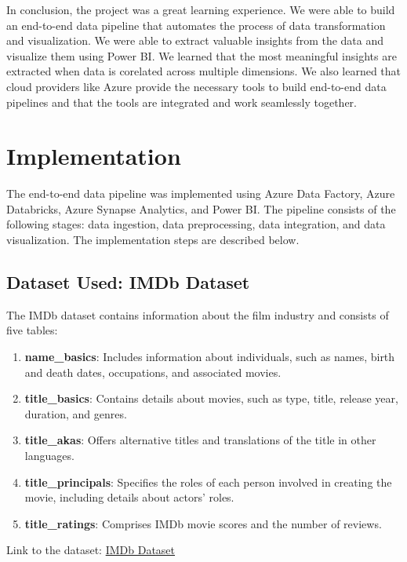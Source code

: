 \documentclass[a4paper,12pt]{article}
\begin{document}
In conclusion, the project was a great learning experience. We were able to build an end-to-end data pipeline that automates the process of data
transformation and visualization. We were able to extract valuable insights from the data and visualize them using Power BI. We learned that
the most meaningful insights are extracted when data is corelated across multiple dimensions. We also learned that cloud providers like Azure
provide the necessary tools to build end-to-end data pipelines and that the tools are integrated and work seamlessly together.

\section{Implementation}
\label{sec:implementation}

The end-to-end data pipeline was implemented using Azure Data Factory, Azure Databricks, Azure Synapse Analytics, and Power BI. The pipeline consists of the following stages: data ingestion, data preprocessing, data integration, and data visualization. The implementation steps are described below.

\subsection{Dataset Used: IMDb Dataset}

The IMDb dataset contains information about the film industry and consists of five tables:
\begin{enumerate}
    \item \textbf{name\_basics}: Includes information about individuals, such as names, birth and death dates, occupations, and associated movies.
    \item \textbf{title\_basics}: Contains details about movies, such as type, title, release year, duration, and genres.
    \item \textbf{title\_akas}: Offers alternative titles and translations of the title in other languages.
    \item \textbf{title\_principals}: Specifies the roles of each person involved in creating the movie, including details about actors' roles.
    \item \textbf{title\_ratings}: Comprises IMDb movie scores and the number of reviews.
\end{enumerate}

Link to the dataset: \href{https://www.kaggle.com/datasets/ashirwadsangwan/imdb-dataset/data}{IMDb Dataset}
\end{document}
